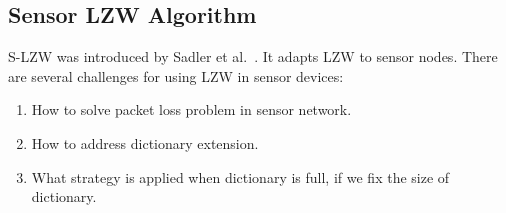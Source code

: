 \subsection{Sensor LZW Algorithm}

S-LZW was introduced by Sadler et al.~\cite{sadler2006data}. It adapts LZW to
sensor nodes. There are several challenges for using LZW in sensor devices:
\begin{enumerate}
    \item How to solve packet loss problem in sensor network.
    \item How to address dictionary extension.
    \item What strategy is applied when dictionary is full, if we fix the size
    of dictionary.
\end{enumerate}

